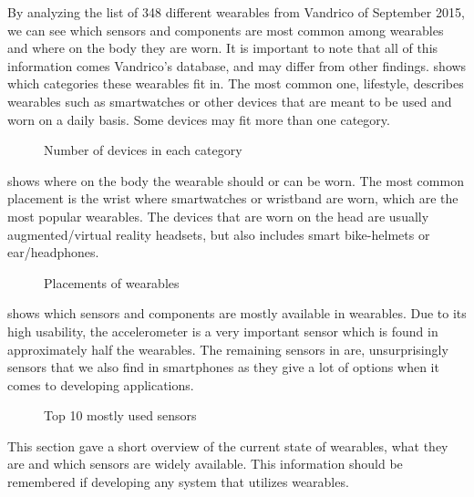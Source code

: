 By analyzing the list of 348 different wearables from Vandrico\cite{LISTOFWEARABLES} of September 2015, 
we can see which sensors and components are most common among wearables and where on the body they are worn. 
It is important to note that all of this information comes Vandrico's database, and may differ from other findings. 
 shows which categories these wearables fit in. The most common one, lifestyle, 
describes wearables such as smartwatches or other devices that are meant to be used and worn on a daily basis. 
Some devices may fit more than one category.

\begin{figure}[!htb]
    \centering
    
    \caption{Number of devices in each category}
    \label{fig:wearables-category}
\end{figure}

 shows where on the body the wearable should or can be worn. 
The most common placement is the wrist where smartwatches or wristband are worn, 
which are the most popular wearables. The devices that are worn on the head are usually augmented/virtual reality headsets, 
but also includes smart bike-helmets or ear/headphones.

\begin{figure}[!htb]
  \centering
  
  \caption{Placements of wearables}
  \label{fig:wearables-placement}
\end{figure}

 shows which sensors and components are mostly available in wearables. 
Due to its high usability, the accelerometer is a very important sensor which is found in approximately half the wearables. 
The remaining sensors in  are, unsurprisingly sensors that we also find in smartphones as they give a lot of options when it comes to developing applications. 
\begin{figure}[!htb]
    \centering
    
    \caption{Top 10 mostly used sensors}
    \label{fig:wearables-sensors}
\end{figure}

This section gave a short overview of the current state of wearables, what they are and which sensors are widely available. 
This information should be remembered if developing any system that utilizes wearables. 

